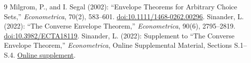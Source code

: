 \documentclass[11pt]{article}
\theoremstyle{remark}\newtheorem{remark}[theorem]{Remark}
\begin{document}
\clearpage
\begin{thebibliography}{9}
Milgrom, P., and I. Segal (2002): ``Envelope Theorems for Arbitrary Choice Sets,'' \textit{Econometrica}, 70(2), 583--601. \href{https://doi.org/10.1111/1468-0262.00296}{doi:10.1111/1468-0262.00296}.
Sinander, L. (2022): ``The Converse Envelope Theorem,'' \textit{Econometrica}, 90(6), 2795--2819. \href{https://doi.org/10.3982/ECTA18119}{doi:10.3982/ECTA18119}.
Sinander, L. (2022): Supplement to ``The Converse Envelope Theorem,'' \textit{Econometrica}, Online Supplemental Material, Sections S.1--S.4. \href{https://www.econometricsociety.org/publications/econometrica/2022/11/01/The-Converse-Envelope-Theorem/supp/ecta200504-sup-0001-onlineappendix.pdf}{Online supplement}.
\end{thebibliography}
\end{document}

